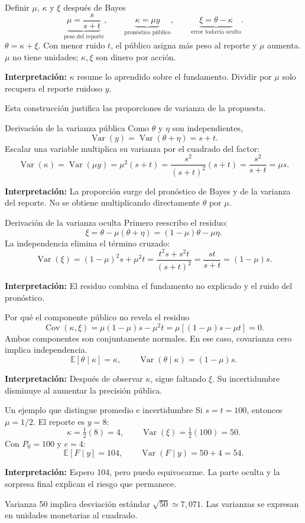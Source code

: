 \documentclass[aspectratio=169,11pt]{beamer}
\newcommand{\E}{\mathbb E}
\newcommand{\Var}{\operatorname{Var}}
\newcommand{\Cov}{\operatorname{Cov}}
\newcommand{\idea}[1]{\par\medskip\textbf{Interpretación:} #1}
\begin{document}
\begin{frame}{Definir \(\mu\), \(\kappa\) y \(\xi\) después de Bayes}
\[
 \underbrace{\mu=\frac{s}{s+t}}_{\text{peso del reporte}},\qquad
 \underbrace{\kappa=\mu y}_{\text{pronóstico público}},\qquad
 \underbrace{\xi=\theta-\kappa}_{\text{error todavía oculto}}.
\]
\(\theta=\kappa+\xi\). Con menor ruido \(t\), el público asigna más peso
al reporte y \(\mu\) aumenta.
\(\mu\) no tiene unidades; \(\kappa,\xi\) son dinero por acción.
\idea{\(\kappa\) resume lo aprendido sobre el fundamento.
Dividir por \(\mu\) solo recupera el reporte ruidoso \(y\).}
\small\medskip\par
Esta construcción justifica las proporciones de varianza de la propuesta.
\end{frame}

\begin{frame}{Derivación de la varianza pública}
Como \(\theta\) y \(\eta\) son independientes,
\[
 \Var(y)=\Var(\theta+\eta)=s+t.
\]
Escalar una variable multiplica su varianza por el cuadrado del factor:
\[
 \Var(\kappa)=\Var(\mu y)=\mu^2(s+t)
 =\frac{s^2}{(s+t)^2}(s+t)
 =\frac{s^2}{s+t}=\boxed{\mu s}.
\]
\idea{La proporción surge del pronóstico de Bayes y de la varianza del
reporte. No se obtiene multiplicando directamente \(\theta\) por \(\mu\).}
\end{frame}

\begin{frame}{Derivación de la varianza oculta}
Primero reescribo el residuo:
\[
 \xi=\theta-\mu(\theta+\eta)=(1-\mu)\theta-\mu\eta.
\]
La independencia elimina el término cruzado:
\[
 \Var(\xi)=(1-\mu)^2s+\mu^2t
 =\frac{t^2s+s^2t}{(s+t)^2}
 =\frac{st}{s+t}=\boxed{(1-\mu)s}.
\]
\idea{El residuo combina el fundamento no explicado y el ruido del pronóstico.}
\end{frame}

\begin{frame}{Por qué el componente público no revela el residuo}
\[
 \Cov(\kappa,\xi)
 =\mu(1-\mu)s-\mu^2t
 =\mu[(1-\mu)s-\mu t]=0.
\]
Ambos componentes son conjuntamente normales.
En ese caso, covarianza cero implica independencia.
\[
 \E[\theta\mid\kappa]=\kappa,\qquad
 \Var(\theta\mid\kappa)=(1-\mu)s.
\]
\idea{Después de observar \(\kappa\), sigue faltando \(\xi\).
Su incertidumbre disminuye al aumentar la precisión pública.}
\end{frame}

\begin{frame}{Un ejemplo que distingue promedio e incertidumbre}
Si \(s=t=100\), entonces \(\mu=1/2\). El reporte es \(y=8\):
\[
 \kappa=\tfrac12(8)=4,\qquad
 \Var(\xi)=\tfrac12(100)=50.
\]
Con \(P_0=100\) y \(e=4\):
\[
 \E[F\mid y]=104,\qquad \Var(F\mid y)=50+4=54.
\]
\idea{Espero 104, pero puedo equivocarme.
La parte oculta y la sorpresa final explican el riesgo que permanece.}
\small\medskip\par
Varianza 50 implica desviación estándar \(\sqrt{50}\simeq7{,}071\).
Las varianzas se expresan en unidades monetarias al cuadrado.
\end{frame}
\end{document}
